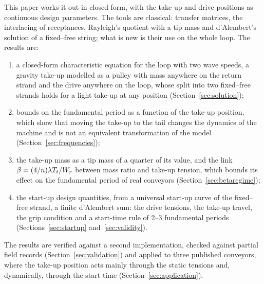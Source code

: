 This paper works it out in closed form, with the take-up and drive positions as continuous
design parameters. The tools are classical: transfer matrices, the interlacing of
receptances, Rayleigh's quotient with a tip mass and d'Alembert's solution of a fixed--free
string; what is new is their use on the whole loop. The results are:
\begin{enumerate}
  \item a closed-form characteristic equation for the loop with two wave speeds, a gravity
  take-up modelled as a pulley with mass anywhere on the return strand and the drive anywhere
  on the loop, whose split into two fixed--free strands holds for a light take-up at any
  position (Section~\ref{sec:solution});
  \item bounds on the fundamental period as a function of the take-up position, which show that
  moving the take-up to the tail changes the dynamics of the machine and is not an equivalent
  transformation of the model (Section~\ref{sec:frequencies});
  \item the take-up mass as a tip mass of a quarter of its value, and the link
  $\beta=(4/n)\lambda T_t/W_r$ between mass ratio and take-up tension, which bounds its
  effect on the fundamental period of real conveyors (Section~\ref{sec:betaregime});
  \item the start-up design quantities, from a universal start-up curve of the fixed--free
  strand, a finite d'Alembert sum: the drive tensions, the take-up travel, the grip condition and
  a start-time rule of 2--3 fundamental periods (Sections~\ref{sec:startup}
  and~\ref{sec:validity}).
\end{enumerate}
The results are verified against a second implementation, checked against partial field records
(Section~\ref{sec:validation}) and applied to three published conveyors, where the take-up
position acts mainly through the static tensions and, dynamically, through the start time
(Section~\ref{sec:application}).

